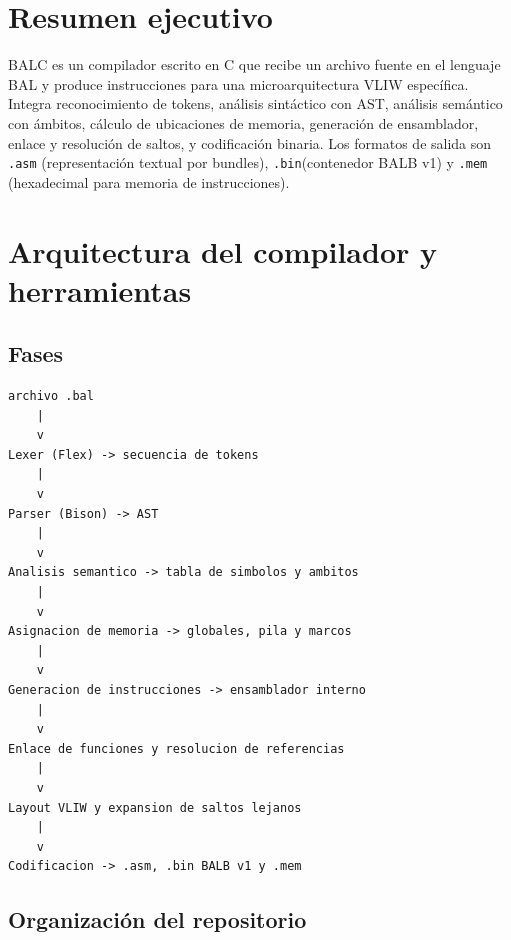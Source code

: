 \section{Resumen ejecutivo}\label{1-resumen-ejecutivo}

BALC es un compilador escrito en C que recibe un archivo fuente en el
lenguaje BAL y produce instrucciones para una microarquitectura VLIW específica.
Integra reconocimiento de tokens, análisis sintáctico con AST, análisis
semántico con ámbitos, cálculo de ubicaciones de memoria, generación de
ensamblador, enlace y resolución de saltos, y codificación binaria. Los
formatos de salida son \texttt{.asm} (representación
textual por bundles), \texttt{.bin}(contenedor BALB
v1) y \texttt{.mem} (hexadecimal para memoria de
instrucciones).


\section{Arquitectura del compilador y
herramientas}\label{2-arquitectura-del-compilador-y-herramientas}

\subsection{Fases}\label{21-fases}

\begin{lstlisting}
archivo .bal
    |
    v
Lexer (Flex) -> secuencia de tokens
    |
    v
Parser (Bison) -> AST
    |
    v
Analisis semantico -> tabla de simbolos y ambitos
    |
    v
Asignacion de memoria -> globales, pila y marcos
    |
    v
Generacion de instrucciones -> ensamblador interno
    |
    v
Enlace de funciones y resolucion de referencias
    |
    v
Layout VLIW y expansion de saltos lejanos
    |
    v
Codificacion -> .asm, .bin BALB v1 y .mem
\end{lstlisting}
\newpage
\subsection{Organización del
repositorio}\label{22-organizaciuxf3n-del-repositorio}


